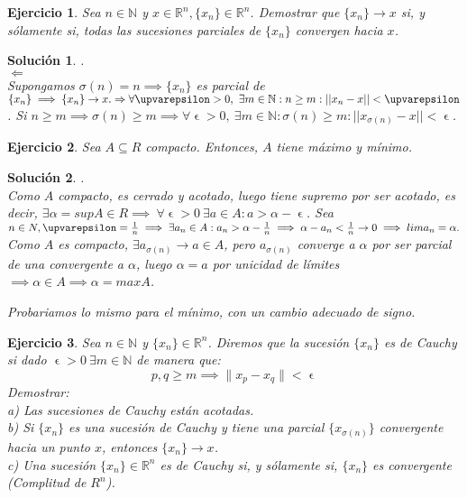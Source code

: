 \documentclass[11pt, a4paper]{article}
\newif\IfInSansMode
\let\epsilon\upvarepsilon
\newcommand{\R}{\mathbb{R}} \newcommand{\N}{\mathbb{N}}
\theoremstyle{theorem-style}
\theoremstyle{definition-style}
\newtheorem{ejer}{Ejercicio}[section]
\theoremstyle{remark-style}
\newtheorem*{sol}{Solución}
\theoremstyle{example-style}
\begin{document}
\begin{ejer}
Sea $n \in \N$ y $x \in \R^n, \{x_n\} \in \R^n$. Demostrar que $\{x_n\} \rightarrow x$ si, y sólamente si, todas las sucesiones parciales de $\{x_n\}$ convergen hacia $x$. 
\end{ejer}

\begin{sol}.
\\ $\Leftarrow$ \\ Supongamos $ \sigma(n)=n \implies \{x_n\} $ es parcial de $ \{x_n\} \implies \{x_n\} \rightarrow x. \\
 \Rightarrow \\ \forall \epsilon > 0, \ \exists m \in \N: n \ge m: ||x_n-x|| < \epsilon$. Si $n \ge m \implies \sigma(n) \ge m \implies \forall \epsilon > 0, \ \exists m \in \N: \sigma(n) \ge m: ||x_{\sigma(n)}-x|| < \epsilon$.
\end{sol}

\begin{ejer}
Sea $A \subseteq R$ compacto. Entonces, $A$ tiene máximo y mínimo.
\end{ejer}

\begin{sol}.
\\ Como $A$ compacto, es cerrado y acotado, luego tiene supremo por ser acotado, es decir, $ \exists \alpha = sup A \in R \implies \ \forall \epsilon > 0 \ \exists a \in A: a > \alpha - \epsilon$. Sea $ n \in N, \epsilon = \frac{1}{n} \implies \exists a_n \in A: a_n > \alpha - \frac{1}{n} \implies \alpha - a_n < \frac{1}{n} \rightarrow 0 \implies lim a_n = \alpha. \\
$Como $A$ es compacto, $ \exists a_{\sigma(n)} \rightarrow a \in A$, pero $a_{\sigma(n)}	$ converge a $\alpha$ por ser parcial de una convergente a $\alpha$, luego $\alpha = a$ por unicidad de límites $\implies \alpha \in A \implies \alpha = max A$.

Probariamos lo mismo para el mínimo, con un cambio adecuado de signo.
\end{sol}

\begin{ejer}
Sea $n \in \N$ y $\{x_n\} \in \R^n$. Diremos que la
sucesión $\{x_n\}$ es de Cauchy si dado $\epsilon > 0 \ \exists m \in \N$ de manera que: $$ p,q \ge m \implies \|x_p-x_q\| < \epsilon$$
Demostrar: \\
a) Las sucesiones de Cauchy están acotadas. \\
b) Si $\{x_n\}$ es una sucesión de Cauchy y tiene una parcial $\{x_{\sigma(n)}\}$ convergente hacia un punto $x$, entonces $\{x_n\} \rightarrow x$. \\
c) Una sucesión $\{x_n\} \in \R^n $ es de Cauchy si, y sólamente si, $\{x_n\}$ es convergente (Complitud de $R^n$).
\end{ejer}
\end{document}
